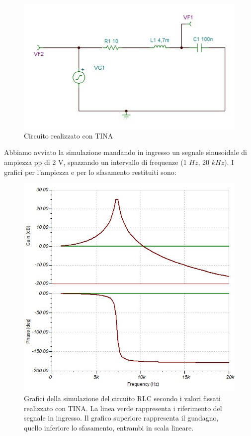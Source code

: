 \documentclass[journal, a4paper]{IEEEtran}
\begin{document}
\begin{figure}[htp]
\centering

\includegraphics[scale=.4]{RLC}

\caption{Circuito realizzato con TINA}
\end{figure}

Abbiamo avviato la simulazione mandando in ingresso un segnale sinusoidale di ampiezza pp di 2 V, spazzando un intervallo di frequenze (1 $Hz$, 20 $kHz$). I grafici per l'ampiezza e per lo sfasamento restituiti sono:

\begin{figure}[htp]
\caption{Grafici della simulazione del circuito RLC secondo i valori fissati realizzato con TINA. La linea verde rappresenta i riferimento del segnale in ingresso. Il grafico superiore rappresenta il guadagno, quello inferiore lo sfasamento, entrambi in scala lineare.}
\label{fig:fig1}
\centering
\includegraphics[scale=.4]{tinadiag}
\end{figure}
\end{document}
